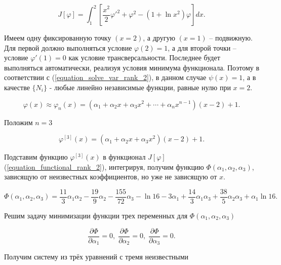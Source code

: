 \documentclass{article}
\begin{document}
\begin{equation}\label{equation_functional_rank_2}
	J[\varphi] = \int_{1}^{2} [\frac{x^2}{2}\varphi'^2 + \varphi^2 - (1 + \ln{x^2})\varphi]dx.
\end{equation}

Имеем одну фиксированную точку $(x=2)$, а другую $(x=1)$ – подвижную. Для первой должно выполняться условие $\varphi(2)=1$, а для второй точки – условие $\varphi'(1)=0$ как условие трансверсальности. Последнее будет выполняться автоматически, реализуя условия минимума функционала. Поэтому в соответствии с (\ref{equation_solve_var_rank_2}), в данном случае $\psi(x) = 1$, а в качестве $\lbrace N_{i} \rbrace$ - любые линейно независимые функции, равные нулю при $x=2$.

\begin{displaymath}
	\varphi(x) \approx \varphi_{n}(x) = (\alpha_{1} + \alpha_{2}x + \alpha_{3}x^2 + \cdots + \alpha_{n}x^{n-1})(x-2)+1.
\end{displaymath}

\noindent Положим $n = 3$

\begin{displaymath}
	\varphi^{[3]}(x) = (\alpha_{1} + \alpha_{2}x + \alpha_{3}x^2)(x-2)+1.
\end{displaymath}

\noindent Подставим функцию $\varphi^{[3]}(x)$ в функционал $J[\varphi]$ (\ref{equation_functional_rank_2}), интегрируя, получим функцию $\Phi(\alpha_{1}, \alpha_{2}, \alpha_{3})$, зависящую от неизвестных коэффициентов, но уже не зависящую от $x$.

\begin{displaymath}
	\Phi(\alpha_{1}, \alpha_{2}, \alpha_{3}) = \frac{11}{3}\alpha_{1}\alpha_{2} - \frac{19}{9}\alpha_{2} - \frac{155}{72}\alpha_{3} - \ln{16} - 3\alpha_{1} + \frac{14}{3}\alpha_{1}\alpha_{3} + \frac{38}{5}\alpha_{2}\alpha_{3} + \alpha_{1}\ln{16}.
\end{displaymath}

Решим задачу минимизации функции трех переменных для $\Phi(\alpha_{1}, \alpha_{2}, \alpha_{3})$

\begin{displaymath}
	\frac{\partial \Phi}{\partial \alpha_{1}} = 0, \;
	\frac{\partial \Phi}{\partial \alpha_{2}} = 0, \;
	\frac{\partial \Phi}{\partial \alpha_{3}} = 0.
\end{displaymath}

\noindent Получим систему из трёх уравнений с тремя неизвестными
\end{document}
